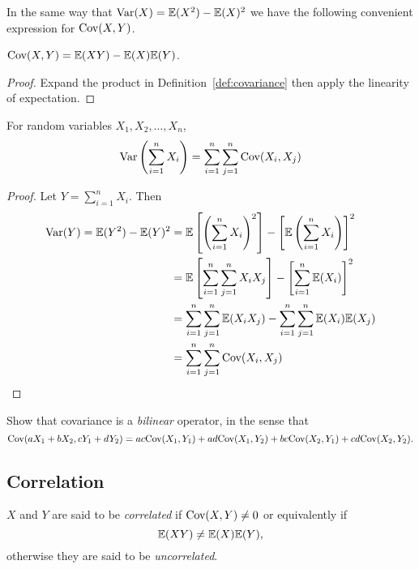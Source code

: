 In the same way that $\text{Var}(X)=\mathbb{E}(X^2)-\mathbb{E}(X)^2$ we have the following convenient expression for $\text{Cov}(X,Y)$.
\begin{lemma}\label{lem:covariance-formula}
$\text{Cov}(X,Y) = \mathbb{E}(XY) - \mathbb{E}(X)\mathbb{E}(Y)$.
\end{lemma}
\begin{proof}
Expand the product in Definition~\ref{def:covariance} then apply the linearity of expectation.
\end{proof}

\begin{lemma}\label{lem:var_of_sum}
For random variables $X_1,X_2,\ldots,X_n$,
\[
\text{Var}\left(\sum_{i=1}^n X_i\right) = \sum_{i=1}^n\sum_{j=1}^n \text{Cov}(X_i,X_j) 
\]
\end{lemma}
\begin{proof}
Let $Y=\sum_{i=1}^n X_i$. Then 
\begin{align*}
\text{Var}(Y) 
	= \mathbb{E}(Y^2)-\mathbb{E}(Y)^2
	& = \mathbb{E}\left[\left(\sum_{i=1}^n X_i\right)^2\right] - \left[\mathbb{E}\left(\sum_{i=1}^n X_i\right)\right]^2 \\
	& = \mathbb{E}\left[\sum_{i=1}^n \sum_{j=1}^n X_iX_j\right] - \left[\sum_{i=1}^n \mathbb{E}(X_i)\right]^2 \\
	& = \sum_{i=1}^n\sum_{j=1}^n \mathbb{E}(X_iX_j) - \sum_{i=1}^n\sum_{j=1}^n \mathbb{E}(X_i)\mathbb{E}(X_j) \\
	& = \sum_{i=1}^n\sum_{j=1}^n \text{Cov}(X_i,X_j)
\end{align*}
\end{proof}

\begin{exercise}\label{exe:covar_bilinear}
Show that covariance is a \emph{bilinear} operator, in the sense that
\[
\text{Cov}(aX_1+bX_2,cY_1+dY_2) = ac\text{Cov}(X_1,Y_1) + ad\text{Cov}(X_1,Y_2) + bc\text{Cov}(X_2,Y_1) + cd\text{Cov}(X_2,Y_2).
\]
\end{exercise}

\subsection{Correlation}

\begin{definition} 
$X$ and $Y$ are said to be \emph{correlated} if $\text{Cov}(X,Y)\neq 0$ or equivalently if
\[
\mathbb{E}(XY)\neq\mathbb{E}(X)\mathbb{E}(Y),
\]
otherwise they are said to be \emph{uncorrelated}.
\end{definition}

